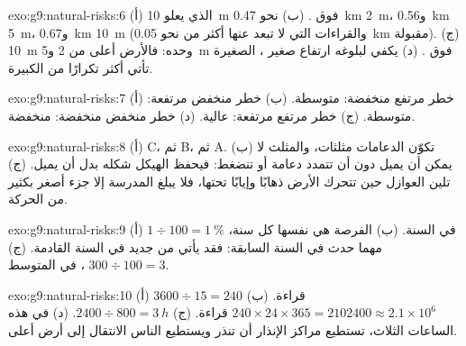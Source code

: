 \begin{solution}{exo:g9:natural-risks:6}
(أ)  الذي يعلو \qty{10}{m} فوق . (ب) نحو \qty{0.47}{km} 
\qty{2}{m}، و\qty{0.56}{km}  \qty{5}{m}، و\qty{0.67}{km} 
\qty{10}{m} (والقراءات التي لا تبعد عنها أكثر من نحو \qty{0.05}{km} مقبولة).
(ج)  \qty{10}{m} وحده: فالأرض أعلى من 2 و\qty{5}{m} فوق . (د) يكفي
لبلوغه ارتفاع صغير ،  الصغيرة تأتي أكثر تكرارًا من الكبيرة.
\end{solution}

\begin{solution}{exo:g9:natural-risks:7}
(أ) خطر مرتفع  منخفضة:  متوسطة. (ب) خطر منخفض  مرتفعة: 
متوسطة. (ج) خطر مرتفع  مرتفعة:  عالية. (د) خطر منخفض  منخفضة:
 منخفضة.
\end{solution}

\begin{solution}{exo:g9:natural-risks:8}
(أ) C، ثم B، ثم A. (ب) تكوّن الدعامات مثلثات، والمثلث لا يمكن أن يميل دون أن
تتمدد دعامة أو تنضغط: فيحفظ الهيكل شكله بدل أن يميل. (ج) تلين العوازل حين تتحرك
الأرض ذهابًا وإيابًا تحتها، فلا يبلغ المدرسة إلا جزء أصغر بكثير من
الحركة.
\end{solution}

\begin{solution}{exo:g9:natural-risks:9}
(أ) $1 \div 100 = 1~\%$ في السنة. (ب) الفرصة هي نفسها كل سنة، مهما حدث في السنة
السابقة: فقد يأتي  من جديد في السنة القادمة. (ج) $300 \div 100 = 3$
، في المتوسط.
\end{solution}

\begin{solution}{exo:g9:natural-risks:10}
(أ) $3600 \div 15 = 240$ قراءة. (ب) $240 \times 24 \times 365 =
\num{2102400} \approx 2.1 \times 10^6$ قراءة. (ج) $2400 \div 800 =
\qty{3}{h}$. (د) في هذه الساعات الثلاث، تستطيع مراكز الإنذار أن تنذر  ويستطيع
الناس الانتقال إلى أرض أعلى.
\end{solution}

